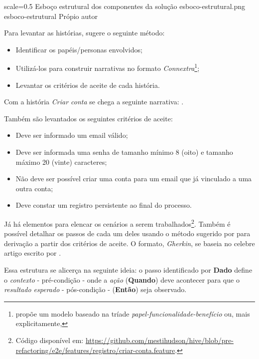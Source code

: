   \imagem
    {scale=0.5}
    {Esboço estrutural dos componentes da solução}
    {esboco-estrutural.png}
    {esboco-estrutural}
    {Própio autor\footnotemark}

  Para levantar as histórias,  sugere o seguinte método:
  \begin{itemize}
    \item Identificar os papéis/personas envolvidos;
    \item Utilizá-los para construir narrativas no formato \emph{Connextra}\footnote{ propõe um modelo baseado na tríade \emph{papel-funcionalidade-benefício} ou, mais explicitamente, };
    \item Levantar os critérios de aceite de cada história.
  \end{itemize}

  Com a história \emph{Criar conta} se chega a seguinte narrativa: .

  Também são levantados os seguintes critérios de aceite:
  \begin{itemize}
    \item Deve ser informado um email válido;
    \item Deve ser informada uma senha de tamanho mínimo 8 (oito) e tamanho máximo 20 (vinte) caracteres;
    \item Não deve ser possível criar uma conta para um email que já vinculado a uma outra conta;
    \item Deve constar um registro persistente ao final do processo.
  \end{itemize}

  Já há elementos para elencar os cenários a serem trabalhados\footnote{Código disponível em: \url{https://github.com/mestihudson/hive/blob/pre-refactoring/e2e/features/registro/criar-conta.feature}.}. Também é possível detalhar os passos de cada um deles usando o método sugerido por  para derivação a partir dos critérios de aceite. O formato, \emph{Gherkin}, se baseia no celebre artigo escrito por .

  Essa estrutura se alicerça na seguinte ideia: o passo identificado por \textbf{Dado} define o \emph{contexto} - pré-condição - onde a \emph{ação} (\textbf{Quando}) deve acontecer para que o \emph{resultado esperado} - pós-condição - (\textbf{Então}) seja observado.

